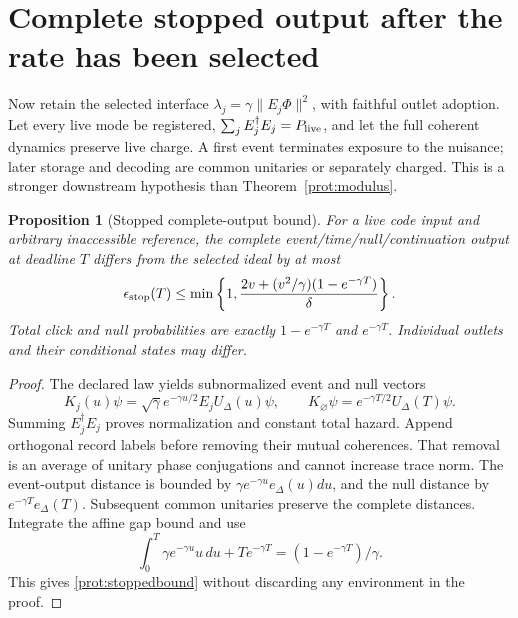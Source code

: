 \documentclass[11pt,oneside,openany]{book}
\newtheorem{proposition}[theorem]{Proposition}
\theoremstyle{definition}
\theoremstyle{remark}\newtheorem{remark}[theorem]{Remark}
\begin{document}
\section{Complete stopped output after the rate has been selected}

Now retain the selected interface $\lambda_j=\gamma\|E_j\Phi\|^2$, with faithful outlet adoption. Let every live mode be registered, $\sum_jE_j^\dagger E_j=P_{\rm live}$, and let the full coherent dynamics preserve live charge. A first event terminates exposure to the nuisance; later storage and decoding are common unitaries or separately charged. This is a stronger downstream hypothesis than Theorem~\ref{prot:modulus}.

\begin{proposition}[Stopped complete-output bound]
\label{prot:stopped}
For a live code input and arbitrary inaccessible reference, the complete event/time/null/continuation output at deadline $T$ differs from the selected ideal by at most
\begin{equation}
 \epsilon_{\rm stop}(T)\le
 \min\left\{1,\frac{2v+(v^2/\gamma)(1-e^{-\gamma T})}{\delta}\right\}.
 \label{prot:stoppedbound}
\end{equation}
Total click and null probabilities are exactly $1-e^{-\gamma T}$ and $e^{-\gamma T}$. Individual outlets and their conditional states may differ.
\end{proposition}
\begin{proof}
The declared law yields subnormalized event and null vectors
\[
 K_j(u)\psi=\sqrt\gamma e^{-\gamma u/2}E_jU_\Delta(u)\psi,
 \qquad K_\varnothing\psi=e^{-\gamma T/2}U_\Delta(T)\psi.
\]
Summing $E_j^\dagger E_j$ proves normalization and constant total hazard. Append orthogonal record labels before removing their mutual coherences. That removal is an average of unitary phase conjugations and cannot increase trace norm. The event-output distance is bounded by
$\gamma e^{-\gamma u}e_\Delta(u)du$, and the null distance by $e^{-\gamma T}e_\Delta(T)$. Subsequent common unitaries preserve the complete distances. Integrate the affine gap bound and use
\[
 \int_0^T\gamma e^{-\gamma u}u\,du+Te^{-\gamma T}
            =(1-e^{-\gamma T})/\gamma.
\]
This gives \eqref{prot:stoppedbound} without discarding any environment in the proof.
\end{proof}
\end{document}
